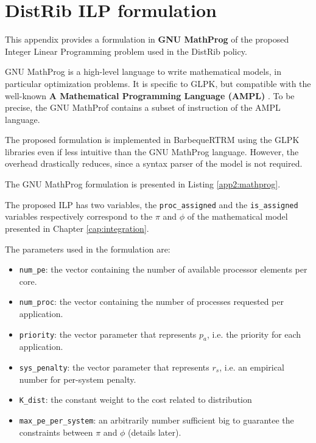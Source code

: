 \chapter{DistRib ILP formulation}
\label{app:distrib-ilp-formulation}
This appendix provides a formulation in \textbf{GNU MathProg} of the proposed
Integer Linear Programming problem used in the DistRib policy.

GNU MathProg is a high-level language to write mathematical models,
in particular optimization problems. It is specific to GLPK, but compatible
with the well-known \textbf{A Mathematical Programming Language (AMPL)}
\cite{fourer1990modeling}. To be precise, the GNU MathProf contains a subset
of instruction of the AMPL language.

The proposed formulation is implemented in BarbequeRTRM using the GLPK
libraries even if less intuitive than the GNU MathProg language. However, the
overhead drastically reduces, since a syntax parser of the model is not
required.

The GNU MathProg formulation is presented in Listing \ref{app2:mathprog}.

The proposed ILP has two variables, the \texttt{proc\_assigned} and the
\linebreak
\texttt{is\_assigned} variables
respectively correspond to the \(\pi\) and \(\phi\) of the mathematical
model presented in Chapter \ref{cap:integration}.

The parameters used in the formulation are:
\begin{itemize}
\item \texttt{num\_pe}: the vector containing the number of available 
processor elements per core.
\item \texttt{num\_proc}: the vector containing the number
of processes requested per application.
\item \texttt{priority}: the vector parameter
that represents \(p_a\), i.e. the priority for each application.
\item \texttt{sys\_penalty}: the vector parameter that represents \(r_s\),
i.e. an empirical number for per-system penalty.
\item \texttt{K\_dist}: the constant weight to the cost related to distribution
\item \texttt{max\_pe\_per\_system}: an arbitrarily number sufficient big to guarantee the constraints between \(\pi\) and \(\phi\) (details later).
\end{itemize}

